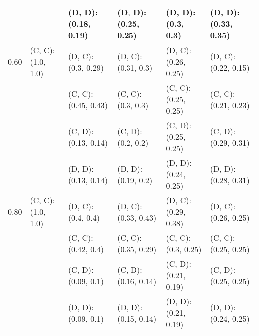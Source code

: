 \begin{tabular}{ l | l l l l l }
     &                          &  (D, D): (0.18, 0.19) &  (D, D): (0.25, 0.25) &  (D, D): (0.3, 0.3)   &  (D, D): (0.33, 0.35) \\ 
\hline
0.60 & (C, C): (1.0, 1.0) & (D, C): (0.3, 0.29)   & (D, C): (0.31, 0.3)   & (D, C): (0.26, 0.25)  & (D, C): (0.22, 0.15) \\
     &                          &  (C, C): (0.45, 0.43)  &  (C, C): (0.3, 0.3)    &  (C, C): (0.25, 0.25)  &  (C, C): (0.21, 0.23) \\
     &                          &  (C, D): (0.13, 0.14)  &  (C, D): (0.2, 0.2)    &  (C, D): (0.25, 0.25)  &  (C, D): (0.29, 0.31) \\
     &                          &  (D, D): (0.13, 0.14) &  (D, D): (0.19, 0.2)  &  (D, D): (0.24, 0.25) &  (D, D): (0.28, 0.31) \\ 
\hline
0.80 & (C, C): (1.0, 1.0) & (D, C): (0.4, 0.4)    & (D, C): (0.33, 0.43)  & (D, C): (0.29, 0.38)  & (D, C): (0.26, 0.25) \\
     &                          &  (C, C): (0.42, 0.4)   &  (C, C): (0.35, 0.29)  &  (C, C): (0.3, 0.25)   &  (C, C): (0.25, 0.25) \\
     &                          &  (C, D): (0.09, 0.1)   &  (C, D): (0.16, 0.14)  &  (C, D): (0.21, 0.19)  &  (C, D): (0.25, 0.25) \\
     &                          &  (D, D): (0.09, 0.1)  &  (D, D): (0.15, 0.14) &  (D, D): (0.21, 0.19) &  (D, D): (0.24, 0.25) \\
\end{tabular}



